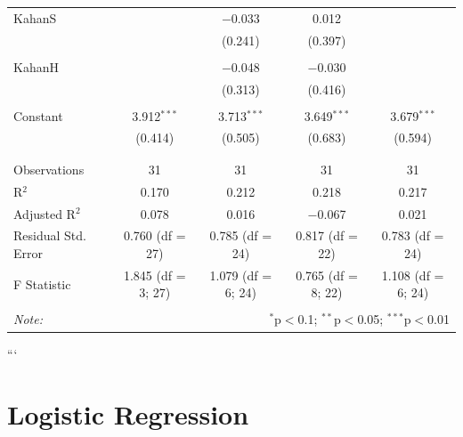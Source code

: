 \documentclass[
]{article}
\begin{document}
\begin{table}[!htbp]
\begin{tabular}{@{\extracolsep{5pt}}lcccc}
 KahanS &  & $-$0.033 & 0.012 &  \\ 
  &  & (0.241) & (0.397) &  \\ 
  & & & & \\ 
 KahanH &  & $-$0.048 & $-$0.030 &  \\ 
  &  & (0.313) & (0.416) &  \\ 
  & & & & \\ 
 Constant & 3.912$^{***}$ & 3.713$^{***}$ & 3.649$^{***}$ & 3.679$^{***}$ \\ 
  & (0.414) & (0.505) & (0.683) & (0.594) \\ 
  & & & & \\ 
\hline \\[-1.8ex] 
Observations & 31 & 31 & 31 & 31 \\ 
R$^{2}$ & 0.170 & 0.212 & 0.218 & 0.217 \\ 
Adjusted R$^{2}$ & 0.078 & 0.016 & $-$0.067 & 0.021 \\ 
Residual Std. Error & 0.760 (df = 27) & 0.785 (df = 24) & 0.817 (df = 22) & 0.783 (df = 24) \\ 
F Statistic & 1.845 (df = 3; 27) & 1.079 (df = 6; 24) & 0.765 (df = 8; 22) & 1.108 (df = 6; 24) \\ 
\hline 
\hline \\[-1.8ex] 
\textit{Note:}  & \multicolumn{4}{r}{$^{*}$p$<$0.1; $^{**}$p$<$0.05; $^{***}$p$<$0.01} \\ 
\end{tabular} 
\end{table} 
\endgroup

```

\hypertarget{logistic-regression}{%
\section{Logistic Regression}\label{logistic-regression}}
\end{document}
